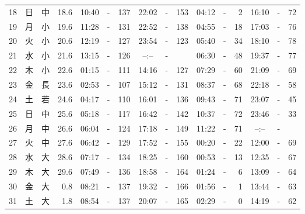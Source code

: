 \documentclass[12pt.a4j]{jsarticle}
\begin{document}
\begin{center}
\begin{table}[ht]
\begin{tabular}{|rc|cr|ccrccr|ccrccr|}
18 & 日 & 中 & 18.6 &  10:40 &-& 137  &  22:02 &-& 153  &   04:12 &-&   2  &   16:10 &-&  72  \\
19 & 月 & 小 & 19.6 &  11:28 &-& 131  &  22:52 &-& 138  &   04:55 &-&  18  &   17:03 &-&  76  \\
20 & 火 & 小 & 20.6 &  12:19 &-& 127  &  23:54 &-& 123  &   05:40 &-&  34  &   18:10 &-&  78  \\
21 & 水 & 小 & 21.6 &  13:15 &-& 126  &  --:-- &-&     &   06:30 &-&  48  &   19:37 &-&  77  \\
22 & 木 & 小 & 22.6 &  01:15 &-& 111  &  14:16 &-& 127  &   07:29 &-&  60  &   21:09 &-&  69  \\
23 & 金 & 長 & 23.6 &  02:53 &-& 107  &  15:12 &-& 131  &   08:37 &-&  68  &   22:18 &-&  58  \\
24 & 土 & 若 & 24.6 &  04:17 &-& 110  &  16:01 &-& 136  &   09:43 &-&  71  &   23:07 &-&  45  \\
25 & 日 & 中 & 25.6 &  05:18 &-& 117  &  16:42 &-& 142  &   10:37 &-&  72  &   23:46 &-&  33  \\
26 & 月 & 中 & 26.6 &  06:04 &-& 124  &  17:18 &-& 149  &   11:22 &-&  71  &   --:-- &-&     \\
27 & 火 & 中 & 27.6 &  06:42 &-& 129  &  17:52 &-& 155  &   00:20 &-&  22  &   12:00 &-&  69  \\
28 & 水 & 大 & 28.6 &  07:17 &-& 134  &  18:25 &-& 160  &   00:53 &-&  13  &   12:35 &-&  67  \\
29 & 木 & 大 & 29.6 &  07:49 &-& 136  &  18:58 &-& 164  &   01:24 &-&   6  &   13:09 &-&  64  \\
30 & 金 & 大 &  0.8 &  08:21 &-& 137  &  19:32 &-& 166  &   01:56 &-&   1  &   13:44 &-&  63  \\
31 & 土 & 大 &  1.8 &  08:54 &-& 137  &  20:07 &-& 165  &   02:29 &-&   0  &   14:19 &-&  62  \\
   \hline
   \end{tabular}
\end{table}
\newpage
\end{center}
\end{document}
